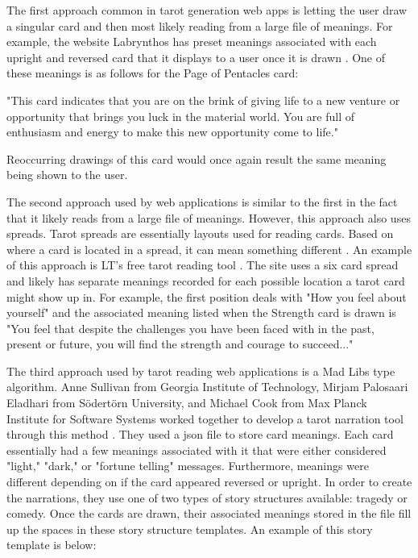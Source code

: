 \documentclass[10pt,twocolumn]{article}
\begin{document}
The first approach common in tarot generation web apps is letting the user draw a singular card and then most likely reading from a large file of meanings. For example, the website Labrynthos has preset meanings associated with each upright and reversed card that it displays to a user once it is drawn \cite{labrynthos}. One of these meanings is as follows for the Page of Pentacles card:

    "This card indicates that you are on the brink of giving life to a new venture or opportunity that brings you luck in the material world. You are full of enthusiasm and energy to make this new opportunity come to life." \cite{labrynthos}
    
Reoccurring drawings of this card would once again result the same meaning being shown to the user. 

The second approach used by web applications is similar to the first in the fact that it likely reads from a large file of meanings. However, this approach also uses spreads. Tarot spreads are essentially layouts used for reading cards. Based on where a card is located in a spread, it can mean something different \cite{wen2015holistic}. An example of this approach is LT's free tarot reading tool \cite{lt}. The site uses a six card spread and likely has separate meanings recorded for each possible location a tarot card might show up in. For example, the first position deals with "How you feel about yourself" and the associated meaning listed when the Strength card is drawn is "You feel that despite the challenges you have been faced with in the past, present or future, you will find the strength and courage to succeed..."

The third approach used by tarot reading web applications is a Mad Libs type algorithm. Anne Sullivan from Georgia Institute of Technology, Mirjam Palosaari Eladhari from Södertörn University, and Michael Cook from Max Planck Institute for Software
Systems worked together to develop a tarot narration tool through this method \cite{Sullivan2018TarotbasedNG}. They used a json file to store card meanings. Each card essentially had a few meanings associated with it that were either considered "light," "dark," or "fortune telling" messages. Furthermore, meanings were different depending on if the card appeared reversed or upright. In order to create the narrations, they use one of two types of story structures available: tragedy or comedy. Once the cards are drawn, their associated meanings stored in the file fill up the spaces in these story structure templates. An example of this story template is below:
\end{document}

